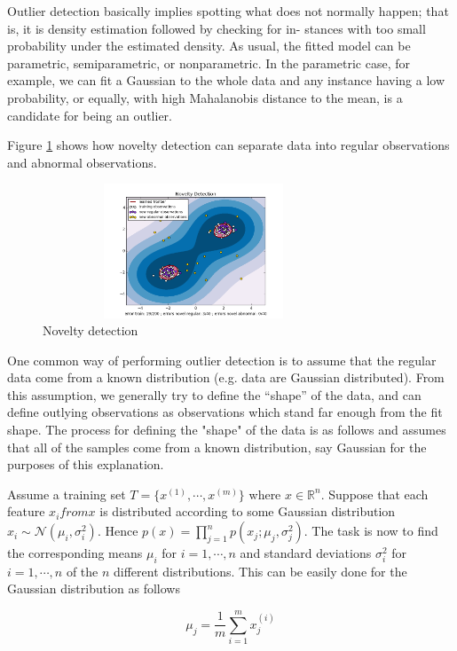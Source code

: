 Outlier detection basically implies spotting what does not normally happen; that is, it is density estimation followed by checking for in- stances with too small probability under the estimated density. As usual, the fitted model can be parametric, semiparametric, or nonparametric. In the parametric case, for example, we can fit a Gaussian to the whole data and any instance having a low probability, or equally, with high Mahalanobis distance to the mean, is a candidate for being an outlier. \cite{anomaly_scikit}

Figure \ref{Fig:noveltyDetection_example} shows how novelty detection can separate data into regular observations and abnormal observations.

\begin{figure}[H]
\centering \includegraphics[width = 90mm, height = 40mm]{imgs/noveltyDetection.png}
\caption{Novelty detection}
\label{Fig:noveltyDetection_example}
\end{figure}

One common way of performing outlier detection is to assume that the regular data come from a known distribution (e.g. data are Gaussian distributed). From this assumption, we generally try to define the “shape” of the data, and can define outlying observations as observations which stand far enough from the fit shape. The process for defining the "shape" of the data is as follows and assumes that all of the samples come from a known distribution, say Gaussian for the purposes of this explanation.

Assume a training set $T = \{x^{(1)}, \cdots, x^(m) \}$ where $x \in \mathbb{R}^n$. Suppose that each feature $x_i from x$ is distributed according to some Gaussian distribution $x_i \sim \mathcal{N}(\mu_i, \sigma_i^2)$. Hence $p(x) = \prod_{j = 1}^n p(x_j; \mu_j, \sigma_j^2)$. The task is now to find the corresponding means $\mu_i$ for $i = 1,\cdots,n$ and standard deviations $\sigma_i^2$ for  $i = 1,\cdots,n$ of the $n$ different distributions. This can be easily done for the Gaussian distribution as follows

\begin{equation}
\mu_j = \frac{1}{m} \sum_{i=1}^{m} x_j^{(i)}
\label{eq:mean_eq_gaussian}
\end{equation}

